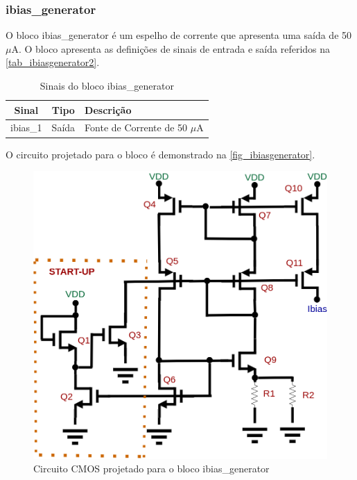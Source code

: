 \renewcommand{\NomeBloco}{ibias\_generator}
\renewcommand{\NomeBlocoNoUnderline}{ibiasgenerator}
\renewcommand{\NomePTab}{tab_\NomeBlocoNoUnderline}
\renewcommand{\NomeSTab}{tab_\NomeBlocoNoUnderline2}
\renewcommand{\NomePFig}{fig_\NomeBlocoNoUnderline}
\renewcommand{\NomeSFig}{fig_\NomeBlocoNoUnderline2}
\renewcommand{\NomeTTab}{tab_\NomeBlocoNoUnderline3}
\renewcommand{\NomeQTab}{tab_\NomeBlocoNoUnderline4}

\subsubsection{\NomeBloco}

O bloco \NomeBloco{} \'e um espelho de corrente que apresenta uma sa\'ida de 50 $\mu$A. O bloco apresenta as defini{\c c}\~oes de sinais de entrada e sa\'ida referidos na \autoref{\NomeSTab}.

\begin{table}[htbp]
\caption{Sinais do bloco \NomeBloco}
\label{\NomeSTab}
\centering
\begin{tabular}{ccl}

    \toprule
    Sinal & Tipo    & Descri{\c c}\~ao        \\
    \midrule \midrule
    ibias\_1   & Saída   & Fonte de Corrente de 50 $\mu$A \\
    \bottomrule
\end{tabular}
\end{table}

O circuito projetado para o bloco \'e demonstrado na \autoref{\NomePFig}.

\begin{figure}[htb]
 \label{\NomePFig}
 \centering
    \centering
    \caption{Circuito CMOS projetado para o bloco \NomeBloco} 
    \includegraphics[scale=0.4]{Circuitos/Ibias_generator.png}
\end{figure}

